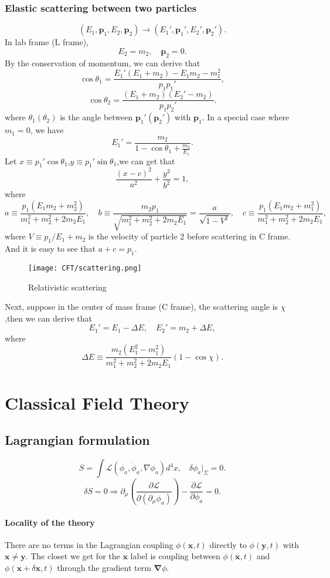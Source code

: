 \subsection{Elastic scattering between two particles}
\[(E_1,\bm{p}_1,E_2,\bm{p}_2) \to (E_1',\bm{p}_1',E_2',\bm{p}_2').\]
In lab frame (L frame),
\[E_2 = m_2 , \quad \bm{p}_2 = 0.\]
By the conservation of momentum, we can derive that
\[\cos \theta_1 = \frac{E_1'(E_1+m_2)-E_1 m_2 - m_1^2}{p_1 p_1'},\]
\[\cos \theta_2 = \frac{(E_1+m_2)(E_2'-m_2)}{p_1 p_2'}.\]
where $\theta_1(\theta_2)$ is the angle between $\bm{p}_1'(\bm{p}_2')$ with $\bm{p}_1$.
In a special case where $m_1 =0$, we have
\[E_1' = \frac{m_2}{1-\cos\theta_1 + \frac{m_2}{E_1}}.\]
Let $x \equiv p_1'\cos\theta_1$,$y \equiv p_1'\sin\theta_1$,we can get that
\[\frac{(x-c)^2}{a^2}+\frac{y^2}{b^2}=1,\]
where
\[a \equiv \frac{p_1(E_1m_2+m_2^2)}{m_1^2 + m_2^2 + 2m_2 E_1}, \quad b \equiv \frac{m_2 p_1}{\sqrt{m_1^2 + m_2^2 + 2m_2 E_1}} = \frac{a}{\sqrt{1-V^2}} , \quad c \equiv \frac{ p_1(E_1m_2+m_1^2)}{m_1^2 + m_2^2 + 2m_2 E_1},\]
where $V \equiv p_1 / {E_1 + m_2}$ is the velocity of particle 2 before scattering in C frame. 
And it is easy to see that $a + c = p_1$.
\begin{figure}[!h]
	\centering
	\texttt{[image: CFT/scattering.png]}
	\caption{Relativistic scattering}
\end{figure}
\noindent
Next, suppose in the center of mass frame (C frame), the scattering angle is $\chi$,then we can derive that
\[E_1' = E_1 - \Delta E , \quad E_2' = m_2 + \Delta E,\]
where
\[\Delta E \equiv \frac{m_2(E_1^2-m_1^2)}{m_1^2 + m_2^2 + 2m_2E_1}(1-\cos\chi).\]

\chapter{Classical Field Theory}
\section{Lagrangian formulation}
\[S = \int \mathcal{L}(\phi_a,\dot{\phi}_a,\nabla \phi_a) d^4 x, \ \ \ \ \delta \phi_a |_{\Sigma} = 0.\]
\[\delta S = 0 \Rightarrow \partial_{\mu} \left (\frac{\partial \mathcal{L}}{\partial (\partial_{\mu} \phi_a)} \right ) - \frac{\partial \mathcal{L}}{\partial \phi_a} = 0.\]
\subsubsection{Locality of the theory}
There are no terms in the Lagrangian coupling $\phi(\bm{x},t)$ directly to  $\phi(\bm{y},t)$ with $\bm{x} \neq \bm{y}$. The closet we get for the $\bm{x}$ label is coupling between $\phi(\bm{x},t)$ and $\phi(\bm{x}+\delta\bm{x},t)$ through the gradient term $\bm{\nabla} \phi$.
